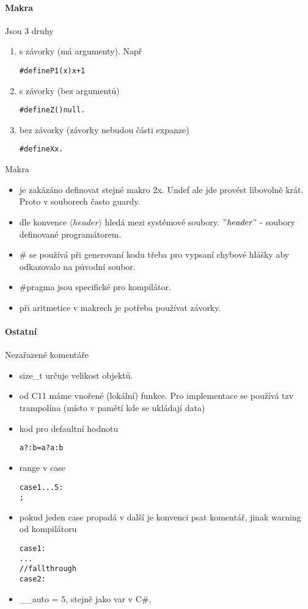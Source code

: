 \paragraph{Makra}
Jsou 3 druhy
\begin{enumerate}
	\item s závorky (má argumenty). Např
	\begin{alltt}
		\# define P1(x) x + 1
	\end{alltt}

	\item s závorky (bez argumentů)
	\begin{alltt}
		\# define Z() null.
	\end{alltt}
	\item bez závorky (závorky nebudou části expanze)
	\begin{alltt}
		\# define X x.
	\end{alltt}
\end{enumerate}

\begin{properties} Makra
	\begin{itemize}
		\item je zakázáno definovat stejné makro 2x.
			Undef ale jde provést libovolně krát.
			Proto v souborech často guardy.
		\item dle konvence $\langle header \rangle$ hledá mezi systémové soubory.
			$"header"$ - soubory definované programátorem.
		\item \# se používá při generovaní kodu třeba pro vypsaní chybové hlášky aby odkazovalo na původní soubor.
		\item \#pragma jsou specifické pro kompilátor.
		\item při aritmetice v makrech je potřeba používat závorky.
	\end{itemize}
\end{properties}

\paragraph{Ostatní}
Nezařazené komentáře

\begin{itemize}
	\item size\_t určuje velikost objektů.
	\item od C11 máme vnořené (lokální) funkce. Pro implementace se používá tzv trampolína (místo v pamětí kde se ukládají data)
	\item kod pro defaultní hodnotu
	\begin{alltt}
		a?:b = a ? a : b
	\end{alltt}
	\item range v case
	\begin{alltt}
		case 1...5:
			;
	\end{alltt}
	\item pokud jeden case propadá v další je konvenci psat komentář, jinak warning od kompilátoru
	\begin{alltt}
		case 1:
			\tab ...
			\tab // fall through
		case 2:
	\end{alltt}
	\item \_\_auto = 5, stejně jako var v C\#.
\end{itemize}


